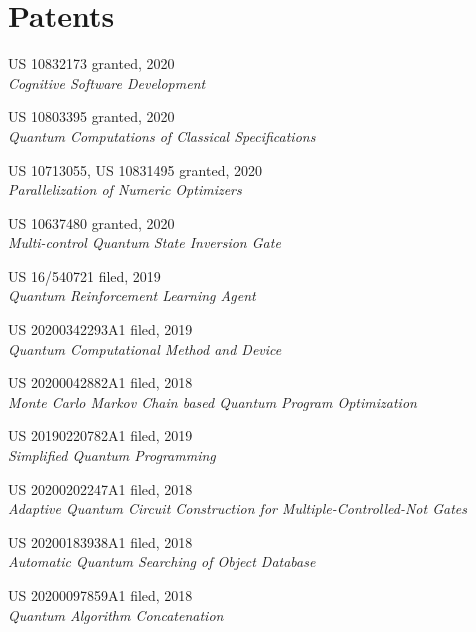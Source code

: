 \section{\sc Patents}

{\sc US 10832173} \hfill {\sc granted}, 2020\\
\emph{Cognitive Software Development}

{\sc US 10803395} \hfill {\sc granted}, 2020\\
\emph{Quantum Computations of Classical Specifications}

{\sc US 10713055, US 10831495} \hfill {\sc granted}, 2020\\
\emph{Parallelization of Numeric Optimizers}

{\sc US 10637480} \hfill {\sc granted}, 2020\\
\emph{Multi-control Quantum State Inversion Gate}

{\sc US 16/540721} \hfill {\sc filed}, 2019\\
\emph{Quantum Reinforcement Learning Agent}

{\sc US 20200342293A1} \hfill {\sc filed}, 2019\\
\emph{Quantum Computational Method and Device}

{\sc US 20200042882A1} \hfill {\sc filed}, 2018\\
\emph{Monte Carlo Markov Chain based Quantum Program Optimization}

{\sc US 20190220782A1} \hfill {\sc filed}, 2019\\
\emph{Simplified Quantum Programming}

{\sc US 20200202247A1} \hfill {\sc filed}, 2018\\
\emph{Adaptive Quantum Circuit Construction for Multiple-Controlled-Not Gates}

{\sc US 20200183938A1} \hfill {\sc filed}, 2018\\
\emph{Automatic Quantum Searching of Object Database}

{\sc US 20200097859A1} \hfill {\sc filed}, 2018\\
\emph{Quantum Algorithm Concatenation}

